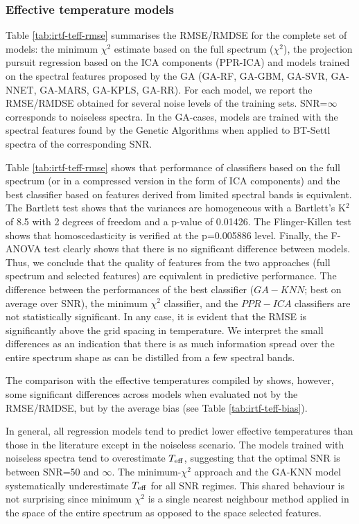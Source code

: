 
\subsubsection{Effective temperature models}
\label{sect:irtf-teff}

Table \ref{tab:irtf-teff-rmse} summarises the RMSE/RMDSE for the
complete set of models: the minimum $\chi^2$ estimate based on the
full spectrum ($\chi^2$), the projection pursuit regression based on
the ICA components (PPR-ICA) and models trained on the spectral
features proposed by the GA (GA-RF, GA-GBM, GA-SVR, GA-NNET, GA-MARS,
GA-KPLS, GA-RR). For each model, we report the RMSE/RMDSE obtained for
several noise levels of the training sets.  SNR=$\infty$ corresponds
to noiseless spectra. In the GA-cases, models are trained with the
spectral features found by the Genetic Algorithms when applied to
BT-Settl spectra of the corresponding SNR.

Table \ref{tab:irtf-teff-rmse} shows that performance of classifiers
based on the full spectrum (or in a compressed version in the form of
ICA components) and the best classifier based on features derived from
limited spectral bands is equivalent. The Bartlett test shows that the
variances are homogeneous with a Bartlett\textquoteright s K$^2$
of 8.5 with 2 degrees of freedom and a p-value of 0.01426. The
Flinger-Killen test shows that homoscedasticity is verified at the
p=0.005886 level. Finally, the F-ANOVA test clearly shows that there
is no significant difference between models. Thus, we conclude that
the quality of features from the two approaches (full spectrum
and selected features) are equivalent in predictive performance.  The
difference between the performances of the best classifier ($GA-KNN$;
best on average over SNR), the minimum $\chi^2$ classifier, and the
$PPR-ICA$ classifiers are not statistically significant.  In any case,
it is evident that the RMSE is significantly above the grid spacing in
temperature. We interpret the small differences as an indication that
there is as much information spread over the entire spectrum shape as
can be distilled from a few spectral bands.

The comparison with the effective temperatures compiled by
\cite{cesetti} shows, however, some significant differences across
models when evaluated not by the RMSE/RMDSE, but by the average bias
(see Table \ref{tab:irtf-teff-bias}). 

In general, all regression models tend to predict lower effective
temperatures than those in the literature except in the noiseless
scenario. The models trained with noiseless spectra tend to
overestimate $T_{\rm eff}$, suggesting that the optimal SNR is between
SNR=50 and $\infty$. The minimum-$\chi^2$ approach and the GA-KNN
model systematically underestimate $T_{\rm eff}$ for all SNR
regimes. This shared behaviour is not surprising since minimum
$\chi^2$ is a single nearest neighbour method applied in the space of
the entire spectrum as opposed to the space selected features.

